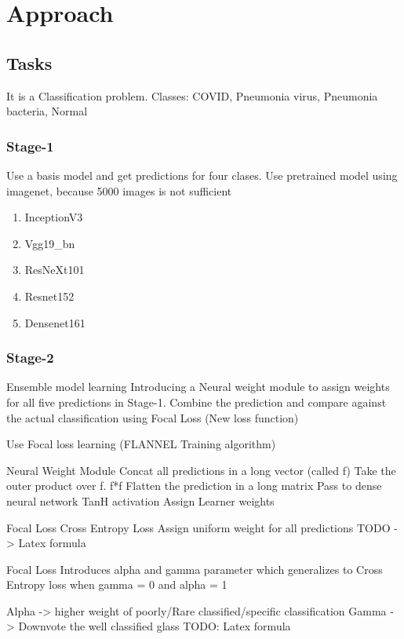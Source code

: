 \documentclass{sigkddExp}
\begin{document}
\section{Approach}

\subsection{Tasks}
It is a Classification problem.
Classes: COVID, Pneumonia virus, Pneumonia bacteria, Normal
\subsubsection{Stage-1}
Use a basis model and get predictions for four clases. Use pretrained model using imagenet, because 5000 images is not sufficient 


\begin{enumerate}
    \item InceptionV3
    \item Vgg19\_bn
    \item ResNeXt101
    \item Resnet152
    \item Densenet161
\end{enumerate}


\subsubsection{Stage-2}

Ensemble model learning
Introducing a Neural weight module to assign weights for all five predictions in Stage-1.
Combine the prediction and compare against the actual classification using Focal Loss (New loss function)

Use Focal loss learning (FLANNEL Training algorithm)

Neural Weight Module
Concat all predictions in a long vector (called f)
Take the outer product over f. f*f
Flatten the prediction in a long matrix
Pass to dense neural network
TanH activation
Assign Learner weights

Focal Loss
Cross Entropy Loss
Assign uniform weight for all predictions
TODO -> Latex formula

Focal Loss
Introduces alpha and gamma parameter which generalizes to Cross Entropy loss when gamma = 0 and alpha = 1

Alpha -> higher weight of poorly/Rare classified/specific classification
Gamma -> Downvote the well classified glass
TODO: Latex formula
\end{document}
